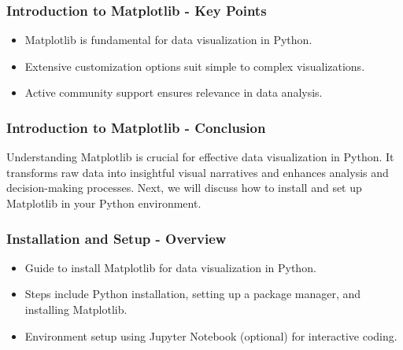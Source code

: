 \documentclass{beamer}
\begin{document}
\begin{frame}[fragile]
    \frametitle{Introduction to Matplotlib - Key Points}
    \begin{itemize}
        \item Matplotlib is fundamental for data visualization in Python.
        \item Extensive customization options suit simple to complex visualizations.
        \item Active community support ensures relevance in data analysis.
    \end{itemize}
\end{frame}

\begin{frame}[fragile]
    \frametitle{Introduction to Matplotlib - Conclusion}
    Understanding Matplotlib is crucial for effective data visualization in Python. It transforms raw data into insightful visual narratives and enhances analysis and decision-making processes.
    \newline
    Next, we will discuss how to install and set up Matplotlib in your Python environment.
\end{frame}

\begin{frame}[fragile]
    \frametitle{Installation and Setup - Overview}
    \begin{itemize}
        \item Guide to install Matplotlib for data visualization in Python.
        \item Steps include Python installation, setting up a package manager, and installing Matplotlib.
        \item Environment setup using Jupyter Notebook (optional) for interactive coding.
    \end{itemize}
\end{frame}
\end{document}
